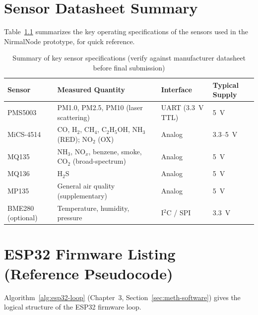 \appendix

\chapter{Sensor Datasheet Summary}
\label{app:datasheets}

Table~\ref{tab:app-datasheets} summarizes the key operating specifications of the sensors used in the NirmalNode prototype, for quick reference. 

\begin{table}[htbp]
\centering
\caption{Summary of key sensor specifications (verify against manufacturer datasheet before final submission)}
\label{tab:app-datasheets}
\small
\begin{tabular}{@{}p{2.6cm}p{4.6cm}p{2cm}p{3.5cm}@{}}
\toprule
\textbf{Sensor} & \textbf{Measured Quantity} & \textbf{Interface} & \textbf{Typical Supply} \\
\midrule
PMS5003 & PM1.0, PM2.5, PM10 (laser scattering) & UART (3.3~V TTL) & 5~V \\
MiCS-4514 & CO, H$_2$, CH$_4$, C$_2$H$_5$OH, NH$_3$ (RED); NO$_2$ (OX) & Analog & 3.3--5~V \\
MQ135 & NH$_3$, NO$_x$, benzene, smoke, CO$_2$ (broad-spectrum) & Analog & 5~V \\
MQ136 & H$_2$S & Analog & 5~V \\
MP135 & General air quality (supplementary) & Analog & 5~V \\
BME280 (optional) & Temperature, humidity, pressure & I$^2$C / SPI & 3.3~V \\
\bottomrule
\end{tabular}
\end{table}

\chapter{ESP32 Firmware Listing (Reference Pseudocode)}
\label{app:firmware}

Algorithm~\ref{alg:esp32-loop} (Chapter~3, Section~\ref{sec:meth-software}) gives the logical structure of the ESP32 firmware loop. 

